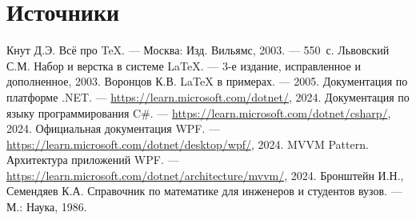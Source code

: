 \documentclass[12pt,a4paper]{scrartcl}
\begin{document}
\section{Источники}
\begin{thebibliography}{9}
Кнут Д.Э. Всё про \TeX. \newblock — Москва: Изд. Вильямс, 2003. — 550~с.
Львовский С.М. Набор и верстка в системе \LaTeX{}. \newblock — 3-е издание, исправленное и дополненное, 2003.
Воронцов К.В. \LaTeX{} в примерах. — 2005.
Документация по платформе .NET. \newblock — \url{https://learn.microsoft.com/dotnet/}, 2024.
Документация по языку программирования C\#. \newblock — \url{https://learn.microsoft.com/dotnet/csharp/}, 2024.
Официальная документация WPF. \newblock — \url{https://learn.microsoft.com/dotnet/desktop/wpf/}, 2024.
MVVM Pattern. Архитектура приложений WPF. \newblock — \url{https://learn.microsoft.com/dotnet/architecture/mvvm/}, 2024.
Бронштейн И.Н., Семендяев К.А. Справочник по математике для инженеров и студентов вузов. \newblock — М.: Наука, 1986.
\end{thebibliography}
\end{document}
